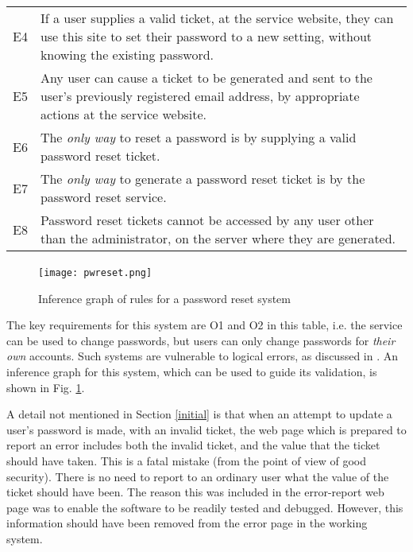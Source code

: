 \begin{table}[tb]
\begin{center}
\begin{tabular}{|c|p{6cm}|}
E4 & If a user supplies a valid ticket, at the service website, they can use this site to set their password to 
a new setting, without knowing the existing password.\\
E5 & Any user can cause a ticket to be generated and sent to the user's previously registered email address, by 
appropriate actions at the service website.\\
E6 & The {\em only way} to reset a password is by supplying a valid password reset ticket.\\
E7 & The {\em only way} to generate a password reset ticket is by the password
reset service.\\
E8 & Password reset tickets cannot be accessed by any user other than the administrator, on the server
where they are generated.\\
\hline
\end{tabular}
\end{center}
\end{table}

\begin{figure}[bhpt]
	\begin{centering}
		\leavevmode\texttt{[image: pwreset.png]}\ \\
		\caption{Inference graph of rules for a password reset system}\label{pwresetrules}
	\end{centering}
\end{figure}

The key requirements for this system are O1 and O2 in this table, i.e. the service can be used to change passwords, but users can only change passwords for {\em their own} accounts. Such systems are vulnerable to logical errors, as discussed in \cite{exptsandproofs}. An inference graph for this system, which can be used to guide its validation, is shown in Fig. \ref{pwresetrules}.


\iffalse
A detail not mentioned in Section \ref{initial} is that when an attempt
to update a user's password is made, with an invalid ticket, the web 
page which is prepared to report an error includes both the invalid
ticket, and the value that the ticket should have taken. This is a fatal
mistake (from the point of view of good security). There is no need
to report to an ordinary user what the value of the ticket should
have been. The reason this was included in the error-report web page
was to enable the software to be readily tested and debugged. However,
this information should have been removed from the error page
in the working system.

